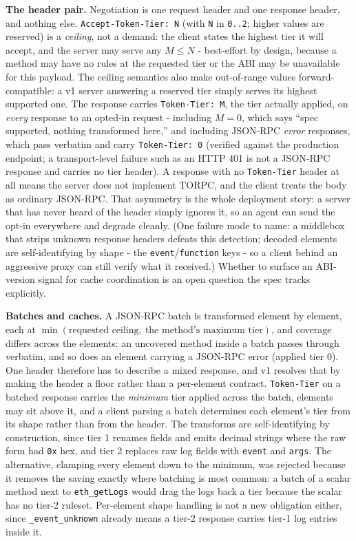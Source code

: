 \documentclass[11pt]{article}
\newcommand{\code}[1]{\texttt{#1}}
\begin{document}
\textbf{The header pair.} Negotiation is one request header and one response header, and nothing else. \code{Accept-Token-Tier: N} (with \code{N} in \code{0..2}; higher values are reserved) is a \emph{ceiling}, not a demand: the client states the highest tier it will accept, and the server may serve any $M \leq N$ - best-effort by design, because a method may have no rules at the requested tier or the ABI may be unavailable for this payload. The ceiling semantics also make out-of-range values forward-compatible: a v1 server answering a reserved tier simply serves its highest supported one. The response carries \code{Token-Tier: M}, the tier actually applied, on \emph{every} response to an opted-in request - including $M = 0$, which says ``spec supported, nothing transformed here,'' and including JSON-RPC \emph{error} responses, which pass verbatim and carry \code{Token-Tier: 0} (verified against the production endpoint; a transport-level failure such as an HTTP 401 is not a JSON-RPC response and carries no tier header). A response with no \code{Token-Tier} header at all means the server does not implement TORPC, and the client treats the body as ordinary JSON-RPC. That asymmetry is the whole deployment story: a server that has never heard of the header simply ignores it, so an agent can send the opt-in everywhere and degrade cleanly. (One failure mode to name: a middlebox that strips unknown response headers defeats this detection; decoded elements are self-identifying by shape - the \code{event}/\code{function} keys - so a client behind an aggressive proxy can still verify what it received.) Whether to surface an ABI-version signal for cache coordination is an open question the spec tracks explicitly.

\textbf{Batches and caches.} A JSON-RPC batch is transformed element by element, each at $\min(\text{requested ceiling},\ \text{the method's maximum tier})$, and coverage differs across the elements: an uncovered method inside a batch passes through verbatim, and so does an element carrying a JSON-RPC error (applied tier 0). One header therefore has to describe a mixed response, and v1 resolves that by making the header a floor rather than a per-element contract. \code{Token-Tier} on a batched response carries the \emph{minimum} tier applied across the batch, elements may sit above it, and a client parsing a batch determines each element's tier from its shape rather than from the header. The transforms are self-identifying by construction, since tier 1 renames fields and emits decimal strings where the raw form had \code{0x} hex, and tier 2 replaces raw log fields with \code{event} and \code{args}. The alternative, clamping every element down to the minimum, was rejected because it removes the saving exactly where batching is most common: a batch of a scalar method next to \code{eth\_getLogs} would drag the logs back a tier because the scalar has no tier-2 ruleset. Per-element shape handling is not a new obligation either, since \code{\_event\_unknown} already means a tier-2 response carries tier-1 log entries inside it.
\end{document}
